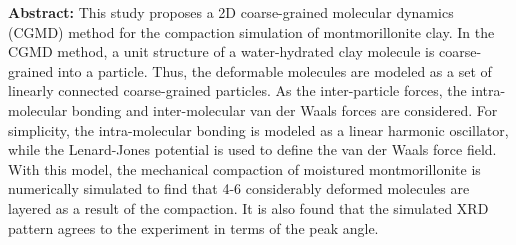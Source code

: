 ﻿\documentclass[11pt,a4j]{jarticle}
\begin{document}
\begin{center}
\begin{minipage}{0.9\hsize}
{\bf Abstract:}
This study proposes a 2D coarse-grained molecular dynamics (CGMD) method for the compaction simulation of montmorillonite clay.
In the CGMD method, a unit structure of a water-hydrated clay molecule is coarse-grained into a particle.
Thus, the deformable molecules are modeled as a set of linearly connected coarse-grained particles.
As the inter-particle forces, the intra-molecular bonding and inter-molecular van der Waals forces are considered.
For simplicity, the intra-molecular bonding is modeled as a linear harmonic oscillator, while the Lenard-Jones potential 
is used to define the van der Waals force field. 
With this model, the mechanical compaction of moistured montmorillonite is numerically simulated to find 
that 4-6 considerably deformed molecules are layered as a result of the compaction.
It is also found that the simulated XRD pattern agrees to the experiment in terms of the peak angle. 
\end{minipage}
\end{center}
\end{document}
